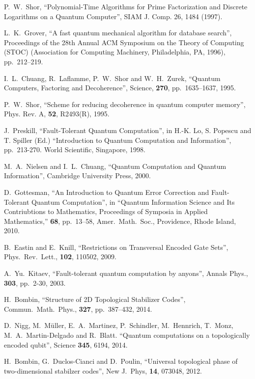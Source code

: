 \documentclass[pra,twocolumn,a4paper,nofootinbib]{revtex4-1}
\begin{document}
\begin{thebibliography}{99}
P.~W.~Shor, ``Polynomial-Time Algorithms for Prime Factorization and Discrete Logarithms on a Quantum Computer'', SIAM J. Comp. 26, 1484 (1997).

L.~K.~Grover, ``A fast quantum mechanical algorithm for database search'', Proceedings of the 28th Annual ACM Symposium on the Theory of Computing (STOC) (Association for Computing Machinery, Philadelphia, PA, 1996), pp.~212--219.

I.~L.~Chuang, R.~Laflamme, P.~W.~Shor and W.~H.~Zurek, ``Quantum Computers, Factoring and Decoherence'', Science, \textbf{270}, pp.~1635--1637, 1995. 

P.~W.~Shor, ``Scheme for reducing decoherence in quantum computer memory'', Phys. Rev. A, \textbf{52}, R2493(R), 1995. 

J.~Preskill, ``Fault-Tolerant Quantum Computation'', in H.-K. Lo, S. Popescu and T. Spiller (Ed.) ``Introduction to Quantum Computation and Information'', pp.~213-270. World Scientific, Singapore, 1998.
 
M.~A.~Nielsen and I.~L.~Chuang, ``Quantum Computation and Quantum Information'', Cambridge University Press, 2000.

D.~Gottesman, ``An Introduction to Quantum Error Correction and Fault-Tolerant Quantum Computation'', in ``Quantum Information Science and Its Contriubtions to Mathematics, Proceedings of Symposia in Applied Mathematics,'' \textbf{68}, pp.~13--58, Amer.~Math.~Soc., Providence, Rhode Island, 2010. 

B.~Eastin and E.~Knill, ``Restrictions on Transversal Encoded Gate Sets'', Phys.~Rev.~Lett., \textbf{102}, 110502, 2009.

A.~Yu.~Kitaev, ``Fault-tolerant quantum computation by anyons'', Annals Phys., \textbf{303}, pp.~2-30, 2003.

H.~Bombin, ``Structure of 2D Topological Stabilizer Codes'', Commun.~Math.~Phys., \textbf{327}, pp.~387--432, 2014.

D.~Nigg, M.~M{\" u}ller, E.~A.~Martinez, P.~Schindler, M.~Hennrich, T.~Monz, M.~A.~Martin-Delgado and R.~Blatt. ``Quantum computations on a topologically encoded qubit'', Science \textbf{345}, 6194, 2014.

H.~Bombin, G.~Duclos-Cianci and D.~Poulin, ``Universal topological phase of two-dimensional stabilzer codes'', ‎New J.~Phys, \textbf{14}, 073048, 2012.


\end{thebibliography}
\end{document}
